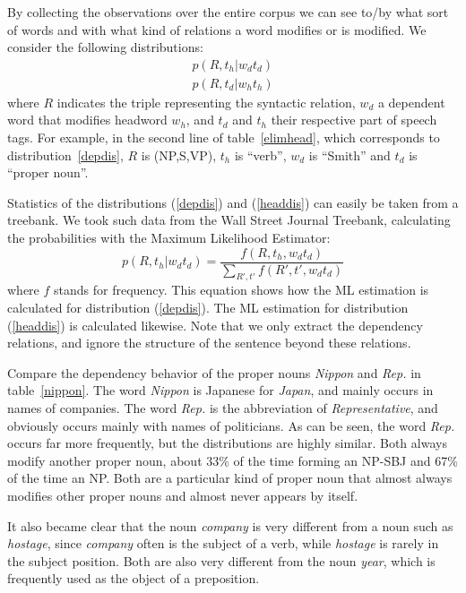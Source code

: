 By collecting the observations over the entire corpus we can see to/by
what sort of words and with what kind of relations a word modifies or
is modified. We consider the following distributions:
\begin{eqnarray}
p(R,t_{h}|w_{d}t_{d}) \label{depdis} \\
p(R,t_{d}|w_{h}t_{h}) \label{headdis}
\end{eqnarray}
where $R$ indicates the triple representing the syntactic relation,
$w_{d}$ a dependent word that modifies headword $w_{h}$, and $t_{d}$
and $t_{h}$ their respective part of speech tags. For example, in the second
line of table~\ref{elimhead}, which corresponds to distribution~\ref{depdis},
$R$ is (NP,S,VP), $t_{h}$ is ``verb'', $w_{d}$ is ``Smith'' and $t_{d}$ is
``proper noun''.

Statistics of the distributions (\ref{depdis}) and (\ref{headdis}) can
easily be taken from a treebank. We took such data from the Wall
Street Journal Treebank, calculating the probabilities with the Maximum
Likelihood Estimator:
\[
p(R, t_{h}|w_{d} t_{d}) = \frac{f(R, t_{h}, w_{d} t_{d})}
                               {\sum_{R',t'}f(R',t',w_{d} t_{d})}
\]
where $f$ stands for frequency. This equation shows how the ML estimation is
calculated for distribution (\ref{depdis}). The ML estimation for distribution
(\ref{headdis}) is calculated likewise. Note that we only extract the dependency
relations, and ignore the structure of the sentence beyond these relations.

Compare the dependency behavior of the proper nouns {\em Nippon} and
{\em Rep.} in table~\ref{nippon}. The word {\em Nippon} is Japanese
for {\em Japan}, and mainly occurs in names of companies. The word
{\em Rep.} is the abbreviation of {\em Representative}, and obviously
occurs mainly with names of politicians.  As can be seen, the word
{\em Rep.}  occurs far more frequently, but the distributions are
highly similar. Both always modify another proper noun, about 33\% of
the time forming an NP-SBJ and 67\% of the time an NP. Both are a
particular kind of proper noun that almost always modifies other
proper nouns and almost never appears by itself.

It also became clear that the noun {\em company} is very different from a noun
such as {\em hostage}, since {\em company} often is the subject of a verb, while
{\em hostage} is rarely in the subject position. Both are also very different
from the noun {\em year}, which is frequently used as the object of a
preposition.

